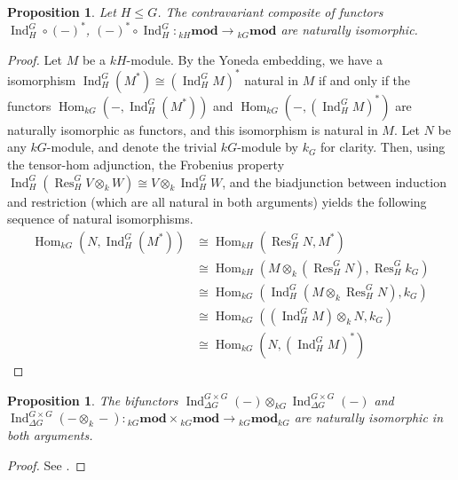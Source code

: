\documentclass[10pt,letterpaper, boxed, cm]{amsart}
\newcommand{\Hom}{\operatorname{Hom}}
\newcommand{\Res}{\operatorname{Res}}
\newcommand{\Ind}{\operatorname{Ind}}
\newtheorem{prop}[theorem]{Proposition}
\theoremstyle{remark}
\theoremstyle{definition}
\begin{document}
	\begin{prop} \label{inddualcommute}
		Let $H \leq G$. The contravariant composite of functors $\Ind^G_H \circ (-)^*$, $(-)^* \circ \Ind^G_H: {}_{kH}\mathbf{mod} \to {}_{kG}\mathbf{mod}$ are naturally isomorphic.
	\end{prop}
	\begin{proof}
		Let $M$ be a $kH$-module. By the Yoneda embedding, we have a isomorphism $\Ind^G_H (M^*) \cong (\Ind^G_H M)^*$ natural in $M$ if and only if the functors $\Hom_{kG}(-, \Ind^G_H (M^*))$ and $\Hom_{kG}(-, (\Ind^G_H M)^*)$ are naturally isomorphic as functors, and this isomorphism is natural in $M$. Let $N$ be any $kG$-module, and denote the trivial $kG$-module by $k_G$ for clarity. Then, using the tensor-hom adjunction, the Frobenius property $\Ind^G_H(\Res^G_H V \otimes_k  W) \cong  V \otimes_k \Ind^G_H W$, and the biadjunction between induction and restriction (which are all natural in both arguments) yields the following sequence of natural isomorphisms.
		\begin{align*}
		\Hom_{kG}(N, \Ind^G_H(M^*))&\cong \Hom_{kH}(\Res^G_H N, M^*)\\
		&\cong \Hom_{kH}(M \otimes_k (\Res^G_H N), \Res^G_H k_G)\\
		&\cong \Hom_{kG}(\Ind^G_H(M \otimes_k \Res^G_H N), k_G)\\
		&\cong \Hom_{kG}((\Ind^G_H M)\otimes_k N, k_G)\\
		&\cong \Hom_{kG}(N, (\Ind^G_H M)^*)
		\end{align*}
	\end{proof}

	\begin{prop}
		The bifunctors $\Ind^{G\times G}_{\Delta G}(-)\otimes_{kG} \Ind^{G\times G}_{\Delta G}(-)$ and $\Ind^{G\times G}_{\Delta G}(- \otimes_k -): {}_{kG}\mathbf{mod}\times {}_{kG}\mathbf{mod} \to {}_{kG}\mathbf{mod}_{kG} $ are naturally isomorphic in both arguments.
	\end{prop}
    \begin{proof}
        See \cite[Corollary 2.4.13]{L181}.
    \end{proof}
\end{document}
